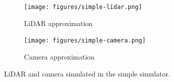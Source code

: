 \begin{figure}
    \centering

    \begin{subfigure}[b]{0.45\textwidth}
        \centering
        \texttt{[image: figures/simple-lidar.png]}
        \caption{LiDAR approximation}
        \label{fig:lidar-approximation}
    \end{subfigure}
    \begin{subfigure}[b]{0.45\textwidth}
        \centering
        \texttt{[image: figures/simple-camera.png]}
        \caption{Camera approximation}
        \label{fig:camera-approximation}
    \end{subfigure}

    \caption{LiDAR and camera simulated in the simple simulator.}\label{fig:sensor-approximation}
\end{figure}



